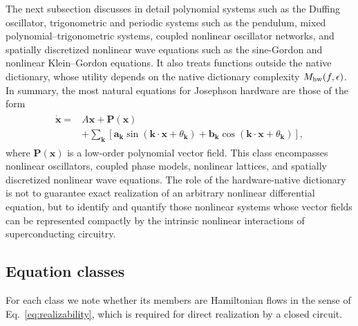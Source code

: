 \documentclass[pra,twocolumn,superscriptaddress,nofootinbib,floatfix]{revtex4-2}
\theoremstyle{remark}
\begin{document}
The next subsection discusses in detail polynomial systems such as the Duffing oscillator, trigonometric and periodic systems such as the pendulum, mixed polynomial--trigonometric systems, coupled nonlinear oscillator networks, and spatially discretized nonlinear wave equations such as the sine-Gordon and nonlinear Klein--Gordon equations. It also treats functions outside the native dictionary, whose utility depends on the native dictionary complexity \(M_{\rm hw}(f,\epsilon)\). In summary, the most natural equations for Josephson hardware are those of the form
\begin{align}
\boxed{
\begin{aligned}
\dot{\mathbf x}={}&A\mathbf x+\mathbf P(\mathbf x)\\
&+\sum_{\mathbf k}\left[\mathbf a_{\mathbf k}\sin(\mathbf k\cdot\mathbf x+\theta_{\mathbf k})+\mathbf b_{\mathbf k}\cos(\mathbf k\cdot\mathbf x+\theta_{\mathbf k})\right],
\end{aligned}
}
\label{eq:native-target-class}
\end{align}
where \(\mathbf P(\mathbf x)\) is a low-order polynomial vector field. This class encompasses nonlinear oscillators, coupled phase models, nonlinear lattices, and spatially discretized nonlinear wave equations. The role of the hardware-native dictionary is not to guarantee exact realization of an arbitrary nonlinear differential equation, but to identify and quantify those nonlinear systems whose vector fields can be represented compactly by the intrinsic nonlinear interactions of superconducting circuitry.

\subsection{Equation classes}

For each class we note whether its members are Hamiltonian flows in the sense of Eq.~\eqref{eq:realizability}, which is required for direct realization by a closed circuit.
\end{document}
